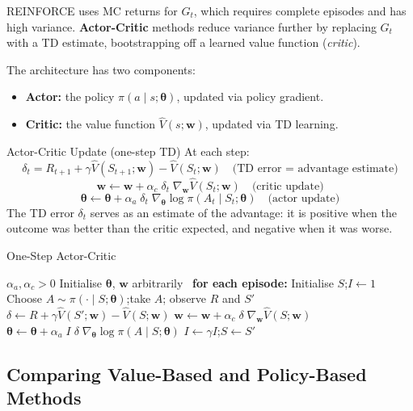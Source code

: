 \documentclass[11pt,a4paper]{article}
\newcommand{\term}[1]{\textcolor{DefGreen}{\textbf{#1}}}
\begin{document}
REINFORCE uses MC returns for $G_t$, which requires complete episodes and has high variance. \term{Actor-Critic} methods reduce variance further by replacing $G_t$ with a TD estimate, bootstrapping off a learned value function (\emph{critic}).

The architecture has two components:
\begin{itemize}
  \item \textbf{Actor:} the policy $\pi(a\mid s;\boldsymbol{\theta})$, updated via policy gradient.
  \item \textbf{Critic:} the value function $\hat{V}(s;\mathbf{w})$, updated via TD learning.
\end{itemize}

\begin{defbox}{Actor-Critic Update (one-step TD)}
At each step:
\[
\delta_t = R_{t+1} + \gamma\hat{V}(S_{t+1};\mathbf{w}) - \hat{V}(S_t;\mathbf{w}) \quad \text{(TD error = advantage estimate)}
\]
\[
\mathbf{w} \leftarrow \mathbf{w} + \alpha_c\;\delta_t\;\nabla_\mathbf{w}\hat{V}(S_t;\mathbf{w}) \quad \text{(critic update)}
\]
\[
\boldsymbol{\theta} \leftarrow \boldsymbol{\theta} + \alpha_a\;\delta_t\;\nabla_{\boldsymbol{\theta}}\log\pi(A_t\mid S_t;\boldsymbol{\theta}) \quad \text{(actor update)}
\]
The TD error $\delta_t$ serves as an estimate of the advantage: it is positive when the outcome was better than the critic expected, and negative when it was worse.
\end{defbox}

\begin{algobox}[breakable]{One-Step Actor-Critic}
\begin{algorithmic}[1]
\Require $\alpha_a, \alpha_c > 0$
\State Initialise $\boldsymbol{\theta}$, $\mathbf{w}$ arbitrarily
\Loop\ \textbf{for each episode:}
  \State Initialise $S$;\quad $I \leftarrow 1$
  \Repeat
    \State Choose $A\sim\pi(\cdot\mid S;\boldsymbol{\theta})$;\quad take $A$; observe $R$ and $S'$
    \State $\delta \leftarrow R + \gamma\hat{V}(S';\mathbf{w}) - \hat{V}(S;\mathbf{w})$
    \State $\mathbf{w} \leftarrow \mathbf{w} + \alpha_c\;\delta\;\nabla_\mathbf{w}\hat{V}(S;\mathbf{w})$
    \State $\boldsymbol{\theta} \leftarrow \boldsymbol{\theta} + \alpha_a\;I\;\delta\;\nabla_{\boldsymbol{\theta}}\log\pi(A\mid S;\boldsymbol{\theta})$
    \State $I \leftarrow \gamma I$;\quad $S \leftarrow S'$
\EndLoop
\end{algorithmic}
\end{algobox}

\subsection{Comparing Value-Based and Policy-Based Methods}
\end{document}
